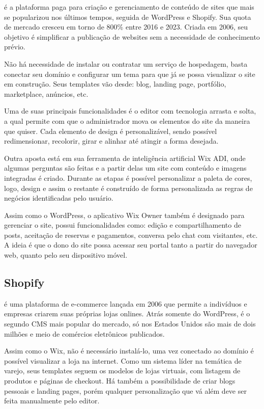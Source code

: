  é a plataforma paga para criação e gerenciamento de conteúdo de sites que mais se popularizou nos últimos tempos, seguida de WordPress e Shopify. Sua quota de mercado cresceu em torno de 800\% entre 2016 e 2023. Criada em 2006, seu objetivo é simplificar a publicação de websites sem a necessidade de conhecimento prévio.

Não há necessidade de instalar ou contratar um serviço de hospedagem, basta conectar seu domínio e configurar um tema para que já se possa visualizar o site em construção. Seus templates vão desde: blog, landing page, portfólio, marketplace, anúncios, etc.

Uma de suas principais funcionalidades é o editor com tecnologia arrasta e solta, a qual permite com que o administrador mova os elementos do site da maneira que quiser. Cada elemento de design é personalizável, sendo possível redimensionar, recolorir, girar e alinhar até atingir a forma desejada.

Outra aposta está em sua ferramenta de inteligência artificial Wix ADI, onde algumas perguntas são feitas e a partir delas um site com conteúdo e imagens integradas é criado. Durante as etapas é possível personalizar a paleta de cores, logo, design e assim o restante é construído de forma personalizada as regras de negócios identificadas pelo usuário.

Assim como o WordPress, o aplicativo Wix Owner também é designado para gerenciar o site, possui funcionalidades como: edição e compartilhamento de posts, aceitação de reservas e pagamentos, conversa pelo chat com visitantes, etc. A ideia é que o dono do site possa acessar seu portal tanto a partir do navegador web, quanto pelo seu dispositivo móvel.

\subsection{Shopify}

 é uma plataforma de e-commerce lançada em 2006 que permite a indivíduos e empresas criarem suas próprias lojas onlines. Atrás somente do WordPress, é o segundo CMS mais popular do mercado, só nos Estados Unidos são mais de dois milhões e meio de comércios eletrônicos publicados.

Assim como o Wix, não é necessário instalá-lo, uma vez conectado ao domínio é possível visualizar a loja na internet. Como um sistema líder na temática de varejo, seus templates seguem os modelos de lojas virtuais, com listagem de produtos e páginas de checkout. Há também a possibilidade de criar blogs pessoais e landing pages, porém qualquer personalização que vá além deve ser feita manualmente pelo editor.

